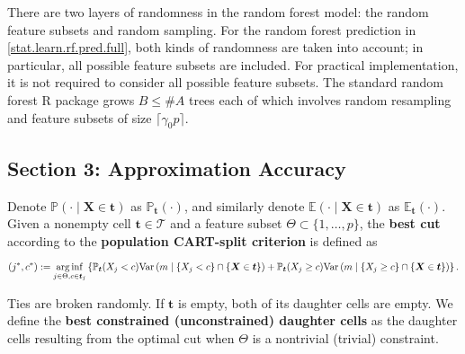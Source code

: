 \begin{remark}\label{stat.learn.rmk.rf.params}

There are two layers of randomness in the random forest model: the random feature subsets and random sampling. For the random forest prediction in \eqref{stat.learn.rf.pred.full}, both kinds of randomness are taken into account; in particular, all possible feature subsets are included. For practical implementation, it is not required to consider all possible feature subsets. The standard random forest R package grows \(B \leq \# A\) trees each of which involves random resampling and feature subsets of size \(\lceil \gamma_0 p \rceil\). 

\end{remark}

\subsection{Section 3: Approximation Accuracy}

\begin{definition}\label{statlearn.pop.cart.split.crit.def}

Denote \(\mathbb{P}\left( \cdot \mid \boldsymbol{X} \in \boldsymbol{t} \right)\) as \(\mathbb{P}_{\boldsymbol{t}}(\cdot)\), and similarly denote \(\mathbb{E}\left( \cdot \mid \boldsymbol{X} \in \boldsymbol{t} \right)\) as \(\mathbb{E}_{\boldsymbol{t}}(\cdot)\). Given a nonempty cell \(\boldsymbol{t} \in \mathcal{T}\) and a feature subset \(\Theta \subset \{1, \ldots, p\}\), the \textbf{best cut} according to the \textbf{population CART-split criterion} is defined as

\[
(j^*, c^*) := \underset{j \in \Theta, c \in \boldsymbol{t}_j}{\arg \inf} \left\{\mathbb{P}_{\boldsymbol{t}}(X_j < c) \mathrm{Var} \left(m \mid \{X_j < c \} \cap \{\boldsymbol{X} \in \boldsymbol{t}\} \right) +  \mathbb{P}_{\boldsymbol{t}}(X_j \geq c) \mathrm{Var} \left(m \mid \{X_j \geq c \} \cap \{\boldsymbol{X} \in \boldsymbol{t}\} \right) \right\}.
\]

Ties are broken randomly. If \(\boldsymbol{t}\) is empty, both of its daughter cells are empty. We define the \textbf{best constrained (unconstrained) daughter cells} as the daughter cells resulting from the optimal cut when \(\Theta\) is a nontrivial (trivial) constraint.

\end{definition}

